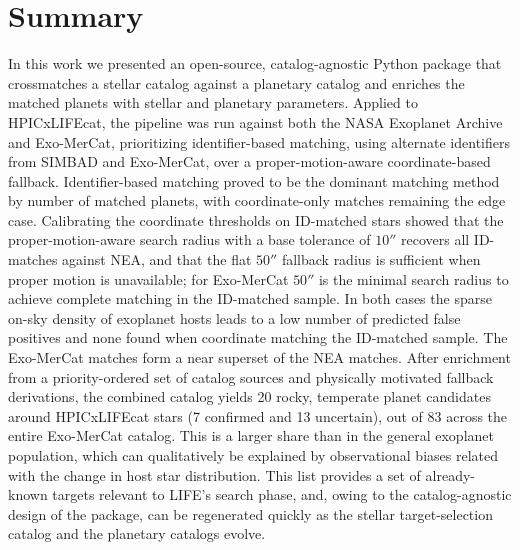 \newpage
\section{Summary}
In this work we presented an open-source, catalog-agnostic Python package that crossmatches a stellar catalog against a planetary catalog and enriches the matched planets with stellar and planetary parameters. Applied to HPICxLIFEcat, the pipeline was run against both the NASA Exoplanet Archive and Exo-MerCat, prioritizing identifier-based matching, using alternate identifiers from SIMBAD and Exo-MerCat, over a proper-motion-aware coordinate-based fallback.
Identifier-based matching proved to be the dominant matching method by number of matched planets, with coordinate-only matches remaining the edge case. Calibrating the coordinate thresholds on ID-matched stars showed that the proper-motion-aware search radius with a base tolerance of $10''$ recovers all ID-matches against NEA, and that the flat $50''$ fallback radius is sufficient when proper motion is unavailable; for Exo-MerCat $50''$ is the minimal search radius to achieve complete matching in the ID-matched sample. In both cases the sparse on-sky density of exoplanet hosts leads to a low number of predicted false positives and none found when coordinate matching the ID-matched sample. The Exo-MerCat matches form a near superset of the NEA matches.
After enrichment from a priority-ordered set of catalog sources and physically motivated fallback derivations, the combined catalog yields 20 rocky, temperate planet candidates around HPICxLIFEcat stars (7 confirmed and 13 uncertain), out of 83 across the entire Exo-MerCat catalog. This is a larger share than in the general exoplanet population, which can qualitatively be explained by observational biases related with the change in host star distribution.  This list provides a set of already-known targets relevant to LIFE's search phase, and, owing to the catalog-agnostic design of the package, can be regenerated quickly as the stellar target-selection catalog and the planetary catalogs evolve.
